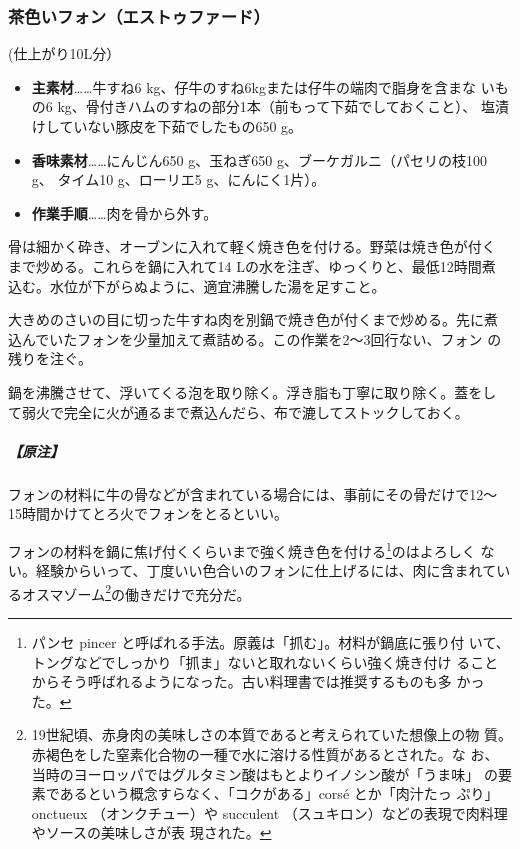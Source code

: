 \begin{recette}
\hypertarget{fonds-brun}{%
\subsubsection{茶色いフォン（エストゥファード）}\label{fonds-brun}}



(仕上がり10L分）

\begin{itemize}
\item
  \textbf{主素材}\ldots{}\ldots{}牛すね6
  kg、仔牛のすね6kgまたは仔牛の端肉で脂身を含まな いもの6
  kg、骨付きハムのすねの部分1本（前もって下茹でしておくこと）、
  塩漬けしていない豚皮を下茹でしたもの650 g。
\item
  \textbf{香味素材}\ldots{}\ldots{}にんじん650 g、玉ねぎ650
  g、ブーケガルニ（パセリの枝100 g、 タイム10 g、ローリエ5
  g、にんにく1片）。
\item
  \textbf{作業手順}\ldots{}\ldots{}肉を骨から外す。
\end{itemize}

骨は細かく砕き、オーブンに入れて軽く焼き色を付ける。野菜は焼き色が付く
まで炒める。これらを鍋に入れて14 Lの水を注ぎ、ゆっくりと、最低12時間煮
込む。水位が下がらぬように、適宜沸騰した湯を足すこと。

大きめのさいの目に切った牛すね肉を別鍋で焼き色が付くまで炒める。先に煮
込んでいたフォンを少量加えて煮詰める。この作業を2〜3回行ない、フォン
の残りを注ぐ。

鍋を沸騰させて、浮いてくる泡を取り除く。浮き脂も丁寧に取り除く。蓋をし
て弱火で完全に火が通るまで煮込んだら、布で漉してストックしておく。

\hypertarget{nota-fonds-brun}{%
\subparagraph{【原注】}\label{nota-fonds-brun}}

フォンの材料に牛の骨などが含まれている場合には、事前にその骨だけで12〜
15時間かけてとろ火でフォンをとるといい。

フォンの材料を鍋に焦げ付くくらいまで強く焼き色を付ける\footnote{パンセ
  pincer と呼ばれる手法。原義は「抓む」。材料が鍋底に張り付
  いて、トングなどでしっかり「抓ま」ないと取れないくらい強く焼き付け
  ることからそう呼ばれるようになった。古い料理書では推奨するものも多
  かった。}のはよろしく
ない。経験からいって、丁度いい色合いのフォンに仕上げるには、肉に含まれてい
るオスマゾーム\footnote{19世紀頃、赤身肉の美味しさの本質であると考えられていた想像上の物
  質。赤褐色をした窒素化合物の一種で水に溶ける性質があるとされた。な
  お、当時のヨーロッパではグルタミン酸はもとよりイノシン酸が「うま味」
  の要素であるという概念すらなく、「コクがある」corsé とか「肉汁たっ
  ぷり」onctueux （オンクチュー）や succulent
  （スュキロン）などの表現で肉料理やソースの美味しさが表 現された。}の働きだけで充分だ。


\end{recette}
